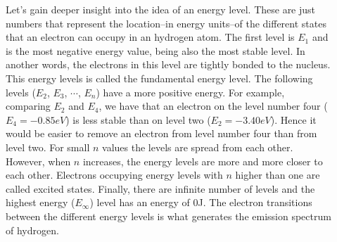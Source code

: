 \documentclass[main.tex]{subfiles}
\newcommand\chapterlabel{electrons}
\begin{document}
\begin{description}
\item[]
Let's gain deeper insight into the idea of an energy level. These are just numbers that represent the location--in energy units--of the different states that an electron can occupy in an hydrogen atom. The first level is $E_1$ and is the most negative energy value, being also the most stable level. In another words, the electrons in this level are tightly bonded to the nucleus. This energy levels is called the fundamental energy level.
The following levels ($E_2$, $E_3$, $\cdots$, $E_n$) have a more positive energy. 
For example, comparing $E_2$ and $E_4$, we have that an electron on the level number four ($E_4=-0.85eV$) is less stable than on level two ($E_2=-3.40eV$). Hence it would be easier to remove an electron from level number four than from level two. For small $n$ values the levels are spread from each other. However, when $n$ increases, the energy levels are more and more closer to each other. Electrons occupying energy levels with $n$ higher than one are called excited states.
Finally, there are infinite number of levels and the highest energy ($E_\infty$) level has an energy of 0J. The electron transitions between the different energy levels is what generates the emission spectrum of hydrogen. 
     \label{Fig:{\chapterlabel}\thefigurenewcounter}
\vspace{-0.5cm}
 \begin{center}
\end{center}
\end{description}
\end{document}
